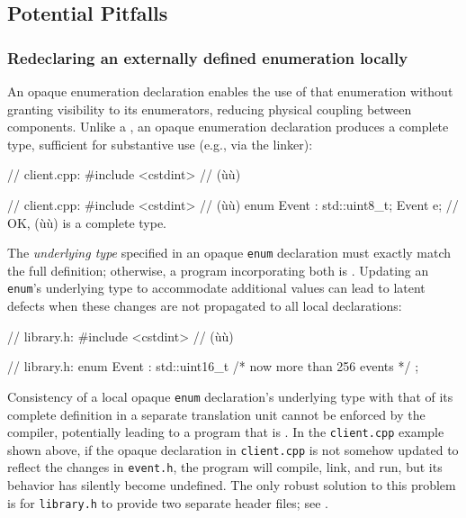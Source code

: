 \subsection[Potential Pitfalls]{Potential Pitfalls}\label{potential-pitfalls-opaqueenum}

\subsubsection[Redeclaring an externally defined enumeration locally]{Redeclaring an externally defined enumeration locally}\label{redeclaring-an-externally-defined-enumeration-locally}

An opaque enumeration declaration enables the use of that
enumeration without granting visibility to its enumerators, reducing
physical coupling between components. Unlike a , an opaque enumeration declaration produces a complete
type, sufficient for substantive use (e.g., via the linker):

\begin{emcppshiddenlisting}[emcppsbatch=e8]
// client.cpp:
#include <cstdint>  // (ù{}ù)
\end{emcppshiddenlisting}
\begin{emcppslisting}[emcppsbatch=e8]
// client.cpp:
#include <cstdint>  // (ù{}ù)
enum Event : std::uint8_t;
Event e;  // OK, (ù{}ù) is a complete type.
\end{emcppslisting}

\noindent The \emph{underlying type} specified in an opaque \lstinline!enum!
declaration must exactly match the full definition; otherwise, a program
incorporating both is . Updating an
\lstinline!enum!'s underlying type to accommodate additional values can
lead to latent defects when these changes are not propagated to all
local declarations:

\begin{emcppshiddenlisting}[emcppsbatch=e9]
// library.h:
#include <cstdint>  // (ù{}ù)
\end{emcppshiddenlisting}
\begin{emcppslisting}[emcppsbatch=e9]
// library.h:
enum Event : std::uint16_t { /* now more than 256 events */ };
\end{emcppslisting}

\noindent Consistency of a local opaque \lstinline!enum! declaration's underlying
type with that of its complete definition in a separate translation unit
cannot be enforced by the compiler, potentially leading to a program
that is . In the \lstinline!client.cpp! example shown above, if the opaque
declaration in \lstinline!client.cpp! is not somehow updated to reflect the
changes in \lstinline!event.h!, the program will compile, link, and run,
but its behavior has silently become undefined. The only robust solution
to this problem is for \lstinline!library.h! to provide two separate header
files; see .

